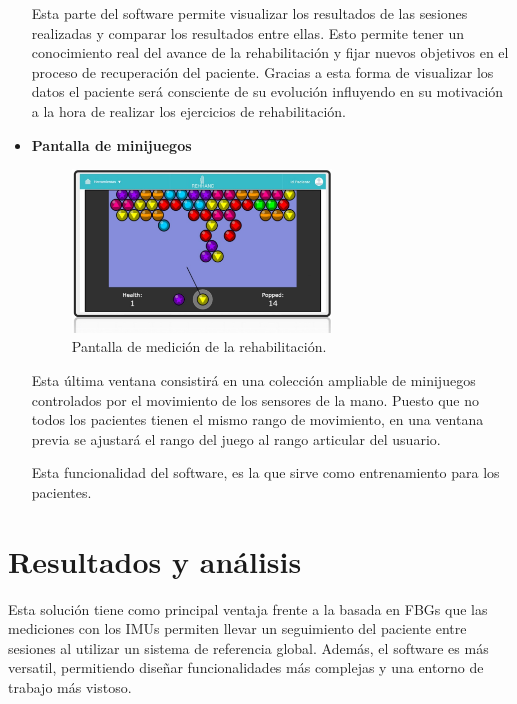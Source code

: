 \begin{itemize}
	Esta parte del software permite visualizar los resultados de las sesiones realizadas y comparar los resultados entre ellas. Esto permite tener un conocimiento real del avance de la rehabilitación y fijar nuevos objetivos en el proceso de recuperación del paciente. Gracias a esta forma de visualizar los datos el paciente será consciente de su evolución influyendo en su motivación a la hora de realizar los ejercicios de rehabilitación.
 
	
	
	\item \textbf{Pantalla de minijuegos}
	
	\begin{figure}[H]
		\centering
		\includegraphics[width=0.65\textwidth]{./img/softwareIMU3}
		\caption{Pantalla de medición de la rehabilitación. } 
		\label{fig:softIMU3}
	\end{figure} 
	
	Esta última ventana consistirá en una colección ampliable de minijuegos controlados por el movimiento de los sensores de la mano. Puesto que no todos los pacientes tienen el mismo rango de movimiento, en una ventana previa se ajustará el rango del juego al rango articular del usuario.
	
	Esta funcionalidad del software, es la que sirve como entrenamiento para los pacientes. 
	
	
\end{itemize}




\section{Resultados y análisis}
\label{sec:resultados4}

   
	
	Esta solución tiene como principal ventaja frente a la basada en FBGs que las mediciones con los IMUs permiten llevar un seguimiento del paciente entre sesiones al utilizar un sistema de referencia global. Además, el software es más versatil, permitiendo diseñar funcionalidades más complejas y una entorno de trabajo más vistoso.
 
